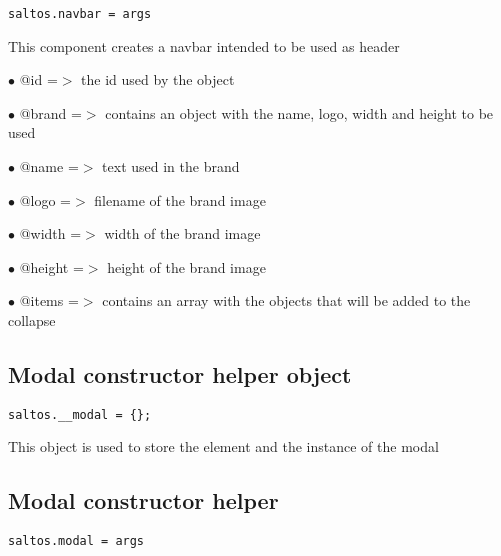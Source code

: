 \documentclass[a4paper]{book}
\begin{document}
\begin{lstlisting}
saltos.navbar = args
\end{lstlisting}

This component creates a navbar intended to be used as header

\begin{compactitem}
\item[\color{myblue}$\bullet$] @id    =$>$ the id used by the object
\item[\color{myblue}$\bullet$] @brand =$>$ contains an object with the name, logo, width and height to be used
\end{compactitem}

\begin{compactitem}
\item[\color{myblue}$\bullet$] @name   =$>$ text used in the brand
\item[\color{myblue}$\bullet$] @logo   =$>$ filename of the brand image
\item[\color{myblue}$\bullet$] @width  =$>$ width of the brand image
\item[\color{myblue}$\bullet$] @height =$>$ height of the brand image
\end{compactitem}

\begin{compactitem}
\item[\color{myblue}$\bullet$] @items =$>$ contains an array with the objects that will be added to the collapse
\end{compactitem}

\hypertarget{toc412}{}
\subsection{Modal constructor helper object}

\begin{lstlisting}
saltos.__modal = {};
\end{lstlisting}

This object is used to store the element and the instance of the modal

\hypertarget{toc413}{}
\subsection{Modal constructor helper}

\begin{lstlisting}
saltos.modal = args
\end{lstlisting}
\end{document}
